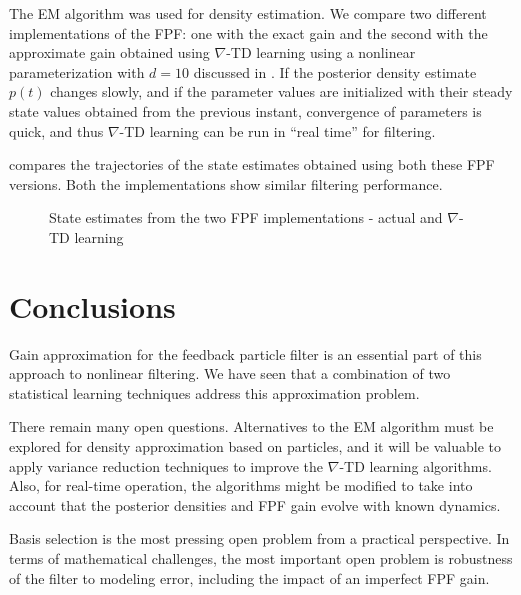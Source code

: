 The EM algorithm was used for density estimation. We compare two different implementations of the FPF: one with the exact gain and the second with the approximate gain obtained using $\nabla$-TD learning using a nonlinear parameterization with $d=10$ discussed in . If the posterior density estimate $p(t)$ changes slowly, and if the parameter values are initialized with their steady state values obtained from the previous instant, convergence of parameters is quick, and thus $\nabla$-TD learning can be run in ``real time'' for filtering.

 compares the trajectories of the state estimates obtained using both these FPF versions. Both the implementations show similar filtering performance.

\begin{figure}
	\begin{center}
		\caption{ State estimates from the two FPF implementations - actual and $\nabla$-TD learning }
		\label{Chap2_Fig_FPF_EM_TD}
	\end{center}
\end{figure}


\section{Conclusions}
\label{section_conclusions}

Gain approximation for the feedback particle filter is an essential part of this approach to nonlinear filtering.  We have seen that a combination of two statistical learning techniques address this approximation problem.

There remain many open questions.   Alternatives to the EM algorithm must be explored for density approximation based on particles,  and it will be valuable to apply variance reduction techniques to improve the $\nabla$-TD learning algorithms.  Also, for real-time operation, the algorithms might be modified to take into account that the posterior densities and FPF gain evolve with known dynamics.  

Basis selection is the most pressing open problem from a practical perspective.  In terms of mathematical challenges, the most important open problem is robustness of the filter to modeling error, including the impact of an imperfect FPF gain.

